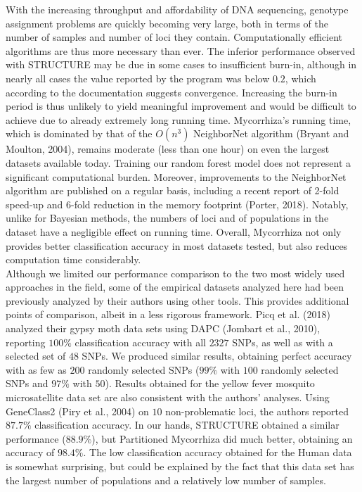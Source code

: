 \documentclass[final]{bioinfo}
\begin{document}
With the increasing throughput and affordability of DNA sequencing, genotype assignment problems are quickly becoming very large, both in terms of the number of samples and number of loci they contain. Computationally efficient algorithms are thus more necessary than ever. The inferior performance observed with STRUCTURE may be due in some cases to insufficient burn-in, although in nearly all cases the value reported by the program was below $0.2$, which according to the documentation suggests convergence. Increasing the burn-in period is thus unlikely to yield meaningful improvement and would be difficult to achieve due to already extremely long running time. Mycorrhiza’s running time, which is dominated by that of the $O(n^{3})$ NeighborNet algorithm (Bryant and Moulton, 2004), remains moderate (less than one hour) on even the largest datasets available today. Training our random forest model does not represent a significant computational burden. Moreover, improvements to the NeighborNet algorithm are published on a regular basis, including a recent report of 2-fold speed-up and 6-fold reduction in the memory footprint (Porter, 2018). Notably, unlike for Bayesian methods, the numbers of loci and of populations in the dataset have a negligible effect on running time. Overall, Mycorrhiza not only provides better classification accuracy in most datasets tested, but also reduces computation time considerably.\\
Although we limited our performance comparison to the two most widely used approaches in the field, some of the empirical datasets analyzed here had been previously analyzed by their authors using other tools. This provides additional points of comparison, albeit in a less rigorous framework. Picq et al. (2018) analyzed their gypsy moth data sets using DAPC (Jombart et al., 2010), reporting $100\%$ classification accuracy with all $2327$ SNPs, as well as with a selected set of $48$ SNPs. We produced similar results, obtaining perfect accuracy with as few as $200$ randomly selected SNPs ($99\%$ with $100$ randomly selected SNPs and $97\%$ with $50$). Results obtained for the yellow fever mosquito microsatellite data set are also consistent with the authors’ analyses. Using GeneClass2 (Piry et al., 2004) on $10$ non-problematic loci, the authors reported $87.7\%$ classification accuracy. In our hands, STRUCTURE obtained a similar performance ($88.9\%$), but Partitioned Mycorrhiza did much better, obtaining an accuracy of $98.4\%$. The low classification accuracy obtained for the Human data is somewhat surprising, but could be explained by the fact that this data set has the largest number of populations and a relatively low number of samples.\\
\end{document}
